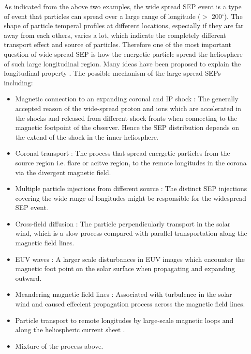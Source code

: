 As indicated from the above two examples, the wide spread \ac{SEP} event is a type of event that particles can spread over a large range of longitude ($>$ 200$^\circ$). The shape of particle temperal profiles at different locations, especially if they are far away from each others, varies a lot, which indicate the completely different transport effect and source of particles. 
Therefore one of the most important question of wide spread \ac{SEP} is how the energetic particle spread the heliosphere of such large longitudinal region. Many ideas have been proposed to explain the longitudinal property \citep{Richardson2014SoPh, Dresing2012SoPh,Desai_Diacalone2016LRSP, Reames2021LNP}. The possible mechanism of the large spread SEPs including:
\begin{itemize}
	\item Magnetic connection to an expanding coronal and IP shock \citep{Cliver1995ICRC, Torsti1999JGR, Reames1999, cane2003two, Richardson2014SoPh, Kouloumvakos2019ApJ}: The generally accepted reason of the wide-spread proton and ions which are accelerated in the shocks and released from different shock fronts when connecting to the magnetic footpoint of the observer. Hence the SEP distribution depends on the extend of the shock in the inner heliosphere.

	\item Coronal transport \citep{Reinhard1974SoPh, Newkirk1978JGR}: The process that spread energetic particles from the source region i.e. flare or acitve region, to the remote longitudes in the corona via the divergent magnetic field. 
	\item Multiple particle injections from different source \citep{dresing202317}: The distinct \ac{SEP} injections covering the wide range of longitudes might be responsible for the widespread SEP event.
	\item Cross-field diffusion \citep{Dresing2012SoPh}: The particle perpendicularly transport in the solar wind, which is a slow process compared with parallel transportation along the magnetic field lines. 
	\item EUV waves \citep{Rouillard2012ApJ, Park2013ApJ}: A larger scale disturbances in EUV images which encounter the magnetic foot point on the solar surface when propagating and expanding outward.
	\item Meandering magnetic field lines \citep{Laitinen2016AA, Laitinen2023ApJL}: Associated with turbulence in the solar wind and caused effecient propagation process across the magnetic field lines.
	\item Particle transport to remote longitudes by large-scale magnetic loops \citep{Klassen2018AA, Schrijver2013ApJ} and along the heliospheric current sheet \citep{Battarbee2018ApJ}.
	\item Mixture of the process above.
\end{itemize}

